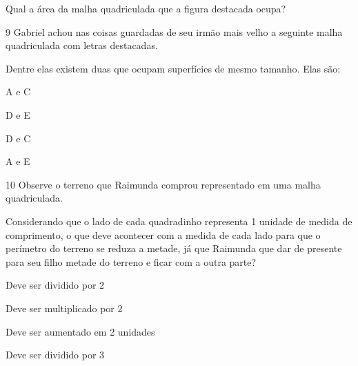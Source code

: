 Qual a área da malha quadriculada que a figura destacada ocupa?



\num{9} Gabriel achou nas coisas guardadas de seu irmão mais velho a
seguinte malha quadriculada com letras destacadas.


Dentre elas existem duas que ocupam superfícies de mesmo tamanho. Elas
são:

\begin{escolha}
\item
  A e C
\item
  D e E
\item
  D e C
\item
  A e E
\end{escolha}


\num{10} Observe o terreno que Raimunda comprou representado em uma malha
quadriculada.


Considerando que o lado de cada quadradinho representa 1 unidade de
medida de comprimento, o que deve acontecer com a medida de cada lado
para que o perímetro do terreno se reduza a metade, já que Raimunda que
dar de presente para seu filho metade do terreno e ficar com a outra
parte?

\begin{escolha}
\item
  Deve ser dividido por 2
\item
  Deve ser multiplicado por 2
\item
  Deve ser aumentado em 2 unidades
\item
  Deve ser dividido por 3
\end{escolha}

